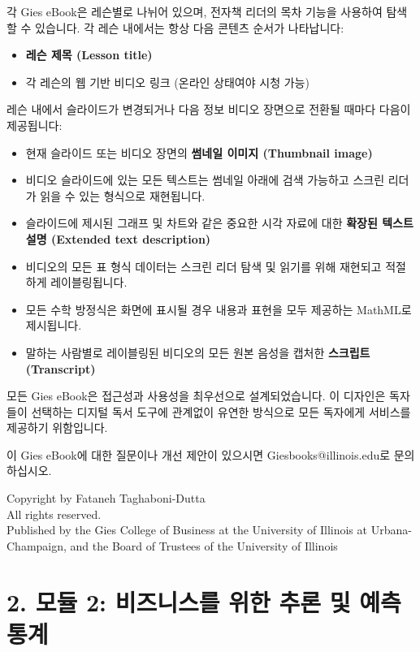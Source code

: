 \documentclass[11pt,a4paper]{book}
\theoremstyle{definition}
\begin{document}
각 Gies eBook은 레슨별로 나뉘어 있으며, 전자책 리더의 목차 기능을 사용하여 탐색할 수 있습니다. 각 레슨 내에서는 항상 다음 콘텐츠 순서가 나타납니다:
\begin{itemize}
    \item \textbf{레슨 제목 (Lesson title)}
    \item 각 레슨의 웹 기반 비디오 링크 (온라인 상태여야 시청 가능)
\end{itemize}
레슨 내에서 슬라이드가 변경되거나 다음 정보 비디오 장면으로 전환될 때마다 다음이 제공됩니다:
\begin{itemize}
    \item 현재 슬라이드 또는 비디오 장면의 \textbf{썸네일 이미지 (Thumbnail image)}
    \item 비디오 슬라이드에 있는 모든 텍스트는 썸네일 아래에 검색 가능하고 스크린 리더가 읽을 수 있는 형식으로 재현됩니다.
    \item 슬라이드에 제시된 그래프 및 차트와 같은 중요한 시각 자료에 대한 \textbf{확장된 텍스트 설명 (Extended text description)}
    \item 비디오의 모든 표 형식 데이터는 스크린 리더 탐색 및 읽기를 위해 재현되고 적절하게 레이블링됩니다.
    \item 모든 수학 방정식은 화면에 표시될 경우 내용과 표현을 모두 제공하는 MathML로 제시됩니다.
    \item 말하는 사람별로 레이블링된 비디오의 모든 원본 음성을 캡처한 \textbf{스크립트 (Transcript)}
\end{itemize}
모든 Gies eBook은 접근성과 사용성을 최우선으로 설계되었습니다. 이 디자인은 독자들이 선택하는 디지털 독서 도구에 관계없이 유연한 방식으로 모든 독자에게 서비스를 제공하기 위함입니다.

이 Gies eBook에 대한 질문이나 개선 제안이 있으시면 Giesbooks@illinois.edu로 문의하십시오.

\begin{infobox}[title=저작권 정보]
Copyright  by Fataneh Taghaboni-Dutta \\
All rights reserved. \\
Published by the Gies College of Business at the University of Illinois at Urbana-Champaign, and the Board of Trustees of the University of Illinois
\end{infobox}


\section{2. 모듈 2: 비즈니스를 위한 추론 및 예측 통계}
\end{document}
